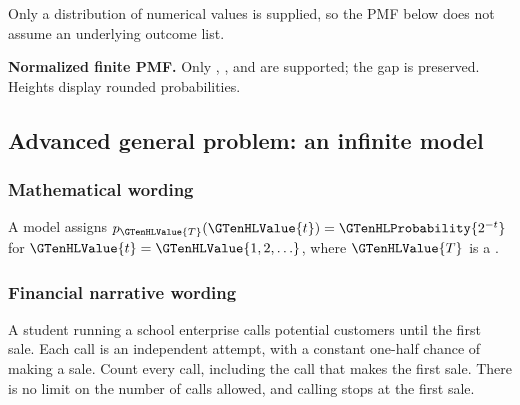 \noindent Only a distribution of numerical values is supplied, so the PMF below does not assume an underlying outcome list.\par\medskip
\Needspace{6.8cm}
\par\noindent \begin{minipage}[t]{.485\linewidth}
\centering
{}
\par\small \textbf{Normalized finite PMF.} Only , , and  are supported; the gap is preserved. Heights display rounded probabilities.
\end{minipage}\par\medskip



\subsection{Advanced general problem: an infinite model}
\label{subsec:t2-c1-advanced-general-problem-an-infinite-model}
\subsubsection*{Mathematical wording}
A model assigns $p_{\GTenHLValue{T}}(\GTenHLValue{t})=\GTenHLProbability{2^{-t}}$ for $\GTenHLValue{t}=\GTenHLValue{1,2,\ldots}$, where $\GTenHLValue{T}$ is a .

\subsubsection*{Financial narrative wording}
A student running a school enterprise calls potential customers until the first sale. Each call is an independent attempt, with a constant one-half chance of making a sale. Count every call, including the call that makes the first sale. There is no limit on the number of calls allowed, and calling stops at the first sale.

